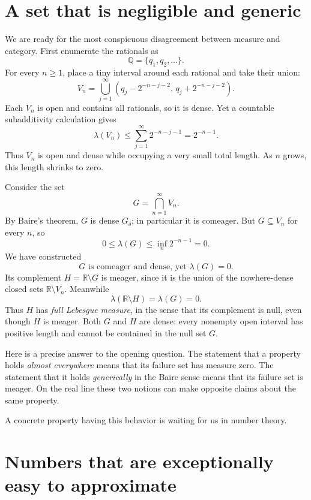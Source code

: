 \section{A set that is negligible and generic}

We are ready for the most conspicuous disagreement between measure and category. First enumerate the rationals as
\[
 \mathbb Q=\{q_1,q_2,\ldots\}.
\]
For every \(n\ge1\), place a tiny interval around each rational and take their union:
\begin{equation}
 V_n=\bigcup_{j=1}^\infty
 \left(q_j-2^{-n-j-2},\,q_j+2^{-n-j-2}\right).
 \label{eq:N20261020-tiny-open}
\end{equation}
Each \(V_n\) is open and contains all rationals, so it is dense. Yet a countable subadditivity calculation gives
\[
 \lambda(V_n)
 \leq\sum_{j=1}^\infty 2^{-n-j-1}
 =2^{-n-1}.
\]
Thus \(V_n\) is open and dense while occupying a very small total length. As \(n\) grows, this length shrinks to zero.

Consider the set
\[
 G=\bigcap_{n=1}^\infty V_n.
\]
By Baire's theorem, \(G\) is dense \(G_\delta\); in particular it is comeager. But \(G\subseteq V_n\) for every \(n\), so
\[
 0\leq\lambda(G)\leq\inf_n2^{-n-1}=0.
\]
We have constructed
\begin{equation}
 \boxed{\text{\(G\) is comeager and dense, yet \(\lambda(G)=0\).}}
 \label{eq:N20261020-residual-null}
\end{equation}
Its complement \(H=\mathbb R\setminus G\) is meager, since it is the union of the nowhere-dense closed sets \(\mathbb R\setminus V_n\). Meanwhile
\[
 \lambda(\mathbb R\setminus H)=\lambda(G)=0.
\]
Thus \(H\) has \emph{full Lebesgue measure}, in the sense that its complement is null, even though \(H\) is meager. Both \(G\) and \(H\) are dense: every nonempty open interval has positive length and cannot be contained in the null set \(G\).

Here is a precise answer to the opening question. The statement that a property holds \emph{almost everywhere} means that its failure set has measure zero. The statement that it holds \emph{generically} in the Baire sense means that its failure set is meager. On the real line these two notions can make opposite claims about the same property.

A concrete property having this behavior is waiting for us in number theory.

\section{Numbers that are exceptionally easy to approximate}


